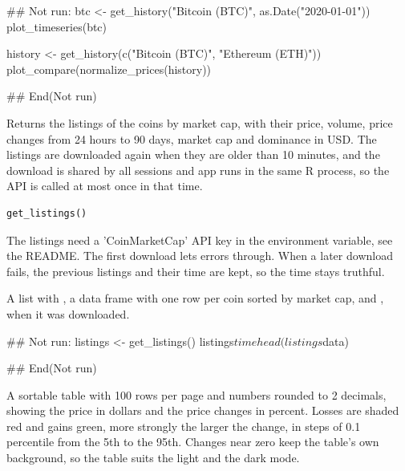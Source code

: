 \documentclass[a4paper]{book}
\begin{document}
%
\begin{Examples}
\begin{ExampleCode}
## Not run: 
btc <- get_history("Bitcoin (BTC)", as.Date("2020-01-01"))
plot_timeseries(btc)

history <- get_history(c("Bitcoin (BTC)", "Ethereum (ETH)"))
plot_compare(normalize_prices(history))

## End(Not run)
\end{ExampleCode}
\end{Examples}
%
\begin{Description}
Returns the listings of the coins by market cap, with their price, volume,
price changes from 24 hours to 90 days, market cap and dominance in USD.
The listings are downloaded again when they are older than 10 minutes,
and the download is shared by all sessions and app runs in the same R
process, so the API is called at most once in that time.
\end{Description}
%
\begin{Usage}
\begin{verbatim}
get_listings()
\end{verbatim}
\end{Usage}
%
\begin{Details}
The listings need a 'CoinMarketCap' API key in the 
environment variable, see the README. The first download lets errors
through. When a later download fails, the previous listings and their
time are kept, so the time stays truthful.
\end{Details}
%
\begin{Value}
A list with , a data frame with one row per coin sorted by
market cap, and , when it was downloaded.
\end{Value}
%
\begin{Examples}
\begin{ExampleCode}
## Not run: 
listings <- get_listings()
listings$time
head(listings$data)

## End(Not run)
\end{ExampleCode}
\end{Examples}
%
\begin{Description}
A sortable table with 100 rows per page and numbers rounded to 2
decimals, showing the price in dollars and the price changes in percent.
Losses are shaded red and gains green, more strongly the larger the
change, in steps of 0.1 percentile from the 5th to the 95th. Changes near
zero keep the table's own background, so the table suits the light and the
dark mode.
\end{Description}
\end{document}
